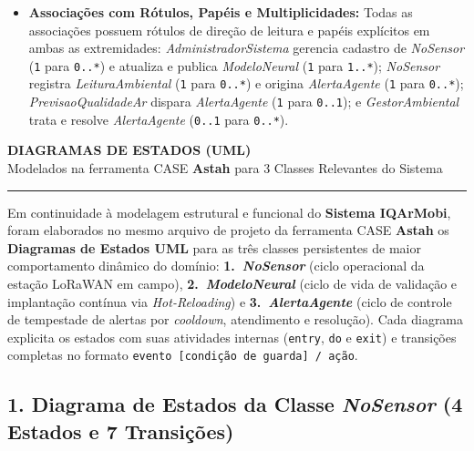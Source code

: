 \documentclass[11pt, a4paper]{article}
\begin{document}
\begin{small}
\begin{itemize}[nosep, leftmargin=0.6cm]
    \item \textbf{Associações com Rótulos, Papéis e Multiplicidades:} Todas as associações possuem rótulos de direção de leitura e papéis explícitos em ambas as extremidades: \emph{AdministradorSistema} gerencia cadastro de \emph{NoSensor} (\texttt{1} para \texttt{0..*}) e atualiza e publica \emph{ModeloNeural} (\texttt{1} para \texttt{1..*}); \emph{NoSensor} registra \emph{LeituraAmbiental} (\texttt{1} para \texttt{0..*}) e origina \emph{AlertaAgente} (\texttt{1} para \texttt{0..*}); \emph{PrevisaoQualidadeAr} dispara \emph{AlertaAgente} (\texttt{1} para \texttt{0..1}); e \emph{GestorAmbiental} trata e resolve \emph{AlertaAgente} (\texttt{0..1} para \texttt{0..*}).
\end{itemize}
\end{small}
\endgroup

\newpage
\begingroup
\sloppy
\setlength{\parskip}{0.10cm}

\begin{center}
    {\Large\bfseries DIAGRAMAS DE ESTADOS (UML)}\\[0.08cm]
    {\normalsize Modelados na ferramenta CASE \textbf{Astah} para 3 Classes Relevantes do Sistema}
    \vspace{0.08cm}
    \hrule
\end{center}

\vspace{0.08cm}

Em continuidade à modelagem estrutural e funcional do \textbf{Sistema IQArMobi}, foram elaborados no mesmo arquivo de projeto da ferramenta CASE \textbf{Astah} os \textbf{Diagramas de Estados UML} para as três classes persistentes de maior comportamento dinâmico do domínio: \textbf{1.~\emph{NoSensor}} (ciclo operacional da estação LoRaWAN em campo), \textbf{2.~\emph{ModeloNeural}} (ciclo de vida de validação e implantação contínua via \emph{Hot-Reloading}) e \textbf{3.~\emph{AlertaAgente}} (ciclo de controle de tempestade de alertas por \emph{cooldown}, atendimento e resolução). Cada diagrama explicita os estados com suas atividades internas (\texttt{entry}, \texttt{do} e \texttt{exit}) e transições completas no formato \texttt{evento [condição de guarda] / ação}.

\subsection*{1. Diagrama de Estados da Classe \emph{NoSensor} (4 Estados e 7 Transições)}
\end{document}
